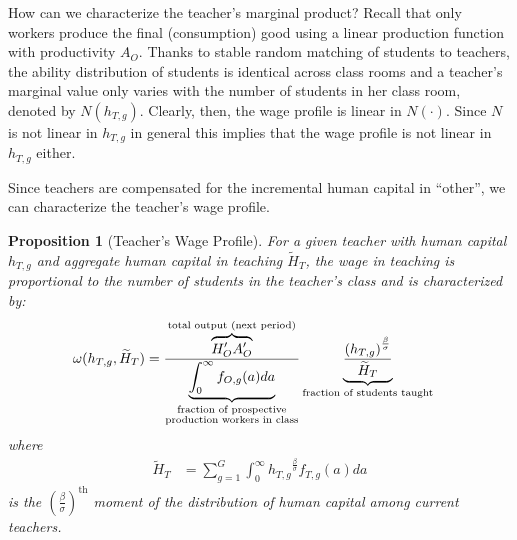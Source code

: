 \documentclass[onehalfspacing,11pt]{article}
\newtheorem{prp}{Proposition}
\begin{document}
		How can we characterize the teacher's marginal product? Recall that only workers produce the final (consumption) good using a linear production function with productivity $A_O$. Thanks to stable random matching of students to teachers, the ability distribution of students is identical across class rooms and a teacher's marginal value only varies with the number of students in her class room, denoted by $N(h_{T,g})$. Clearly, then, the wage profile is linear in $N(\cdot)$. Since $N$ is not linear in $h_{T,g}$ in general this implies that the wage profile is not linear in $h_{T,g}$ either.
		
		Since teachers are compensated for the incremental human capital in ``other'', we can characterize the teacher's wage profile.
		\begin{prp}[Teacher's Wage Profile]\label{prp:omega} For a given teacher with human capital $h_{T,g}$ and aggregate human capital in teaching $\widetilde{H}_T$, the wage in teaching is proportional to the \textit{number of students} in the teacher's class and is characterized by:
			\begin{align}
				\label{eq:omegaOpt}
				\omega(h_{T,g},\widetilde{H}_T) & =  \frac{\overbrace{{H}'_O {A}'_O}^{\textrm{total output (next period)}}}{\underbrace{\int_0^\infty f_{O,g}(a) da}_{\begin{subarray}{c}\textrm{fraction of prospective} \\ \textrm{production workers in class}\end{subarray}}} \underbrace{\frac{\left( h_{T,g} \right)^{\frac{\beta}{\sigma}}}{{\widetilde{H}_T}}}_{\textrm{fraction of students taught}}
			\end{align}
			where
			\begin{align*}
				\label{}
				\widetilde{H}_{T} & = \sum_{g=1}^G\int_0^\infty {h_{T,g}}^{\frac{\beta}{\sigma}} f_{T,g}(a) da
			\end{align*}
			is the ${\left( \tfrac{\beta}{\sigma} \right)}^{\textrm{th}}$ moment of the distribution of human capital among current teachers.
		\end{prp}
		
\end{document}

